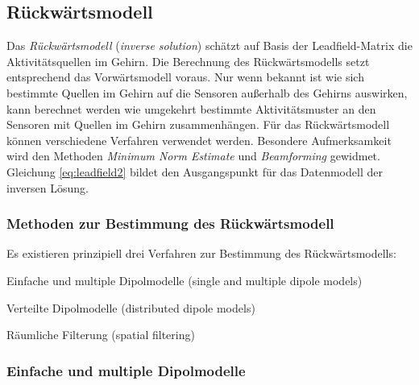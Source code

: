\documentclass[doc,a4paper,12pt]{apa6}
\begin{document}


\subsection{Rückwärtsmodell}

Das \emph{Rückwärtsmodell} (\emph{inverse solution}) schätzt auf Basis der Leadfield-Matrix die Aktivitätsquellen im Gehirn. Die Berechnung des Rückwärtsmodells setzt entsprechend das Vorwärtsmodell voraus. Nur wenn bekannt ist wie sich bestimmte Quellen im Gehirn auf die Sensoren außerhalb des Gehirns auswirken, kann berechnet werden wie umgekehrt bestimmte Aktivitätsmuster an den Sensoren mit Quellen im Gehirn zusammenhängen. Für das Rückwärtsmodell können verschiedene Verfahren verwendet werden. Besondere Aufmerksamkeit wird den Methoden \emph{Minimum Norm Estimate} und \emph{Beamforming} gewidmet. Gleichung \ref{eq:leadfield2} bildet den Ausgangspunkt für das Datenmodell der inversen Lösung.

\subsubsection{Methoden zur Bestimmung des Rückwärtsmodell}

Es existieren prinzipiell drei Verfahren zur Bestimmung des Rückwärtsmodells:

\begin{compactitem}
\item Einfache und multiple Dipolmodelle (single and multiple dipole models)
\item Verteilte Dipolmodelle (distributed dipole models)
\item Räumliche Filterung (spatial filtering)
\end{compactitem}

\subsubsection{Einfache und multiple Dipolmodelle}
\end{document}
